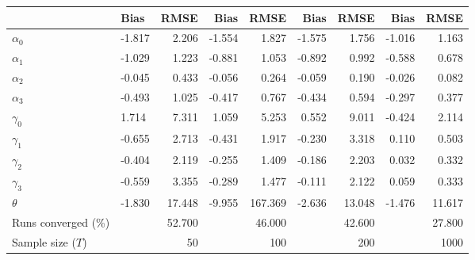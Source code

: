 
\begin{tabular}[t]{llrrrrrrr}
\toprule
  & Bias & RMSE & Bias & RMSE & Bias & RMSE & Bias & RMSE\\
\midrule
$\alpha_{0}$ & -1.817 & 2.206 & -1.554 & 1.827 & -1.575 & 1.756 & -1.016 & 1.163\\
$\alpha_{1}$ & -1.029 & 1.223 & -0.881 & 1.053 & -0.892 & 0.992 & -0.588 & 0.678\\
$\alpha_{2}$ & -0.045 & 0.433 & -0.056 & 0.264 & -0.059 & 0.190 & -0.026 & 0.082\\
$\alpha_{3}$ & -0.493 & 1.025 & -0.417 & 0.767 & -0.434 & 0.594 & -0.297 & 0.377\\
$\gamma_{0}$ & 1.714 & 7.311 & 1.059 & 5.253 & 0.552 & 9.011 & -0.424 & 2.114\\
$\gamma_{1}$ & -0.655 & 2.713 & -0.431 & 1.917 & -0.230 & 3.318 & 0.110 & 0.503\\
$\gamma_{2}$ & -0.404 & 2.119 & -0.255 & 1.409 & -0.186 & 2.203 & 0.032 & 0.332\\
$\gamma_{3}$ & -0.559 & 3.355 & -0.289 & 1.477 & -0.111 & 2.122 & 0.059 & 0.333\\
$\theta$ & -1.830 & 17.448 & -9.955 & 167.369 & -2.636 & 13.048 & -1.476 & 11.617\\
Runs converged (\%) &  & 52.700 &  & 46.000 &  & 42.600 &  & 27.800\\
Sample size ($T$) &  & 50 &  & 100 &  & 200 &  & 1000\\
\bottomrule
\end{tabular}
